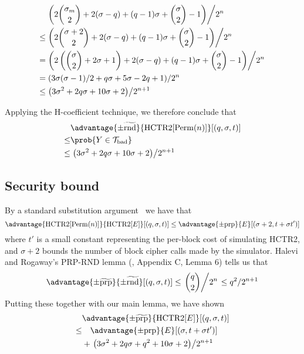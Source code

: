 \documentclass[hctr.tex]{subfiles}
\begin{document}
\begin{align*}
    & \left.\left(2\binom{\sigma_m}{2} + 2(\sigma - q) + (q-1)\sigma + \binom{\sigma}{2} -1\right)\middle/2^n\right. \\
    \leq & \left.\left(2\binom{\sigma + 2}{2} + 2(\sigma - q) + (q-1)\sigma + \binom{\sigma}{2} -1\right)\middle/2^n\right. \\
    = & \left.\left(2\left(\binom{\sigma}{2} + 2\sigma + 1\right) + 2(\sigma - q) + (q-1)\sigma + \binom{\sigma}{2} -1\right)\middle/2^n\right. \\
    = & \left.\left(3\sigma(\sigma - 1)/2 + q\sigma + 5\sigma - 2q + 1\right)\middle/2^n\right. \\
    \leq & \left.\left(3\sigma^2 + 2q\sigma + 10\sigma + 2\right)\middle/2^{n+1}\right. \\
\end{align*}

Applying the H-coefficient technique, we therefore conclude that
\begin{align*}
    & \advantage{\pm\widetilde{\mathrm{rnd}}}{\HCTR[\Perm(n)]}[(q, \sigma, t)] \\
    \leq & \prob{Y \in \Tb} \\
    \leq & \left.\left(3\sigma^2 + 2q\sigma + 10\sigma + 2\right)\middle/2^{n+1}\right.
\end{align*}

\subsection{Security bound}
By a standard substitution argument~\cite{cbcsec,concrete} we have that
\begin{displaymath}
    \advantage{\HCTR[\Perm(n)]}{\HCTR[E]}[(q, \sigma, t)]
    \leq \advantage{\pm \mathrm{prp}}{E}[(\sigma + 2, t + \sigma t')]
\end{displaymath}
where \(t'\) is a small constant
representing the per-block cost of simulating HCTR2, and
\(\sigma + 2\) bounds the number of block cipher calls made by the simulator.
Halevi and Rogaway's PRP-RND lemma
(\cite{cmc}, Appendix C, Lemma 6) tells us that
\begin{displaymath}
    \advantage{\pm \widetilde{\mathrm{prp}}}{\pm\widetilde{\mathrm{rnd}}}[(q, \sigma, t)] 
    \leq \left.\binom{q}{2}\middle/2^n\right.
    \leq q^2/2^{n+1}
\end{displaymath}
Putting these together with our main lemma, we have shown
\begin{align*}
    &\advantage{\pm \widetilde{\mathrm{prp}}}{\HCTR[E]}[(q, \sigma, t)] \\
    \leq & \quad \advantage{\pm \mathrm{prp}}{E}[(\sigma, t + \sigma t')] \\
    &+ \left.\left(3\sigma^2 + 2q\sigma + q^2 + 10\sigma + 2\right)\middle/2^{n+1}\right. \\
\end{align*}
\end{document}
